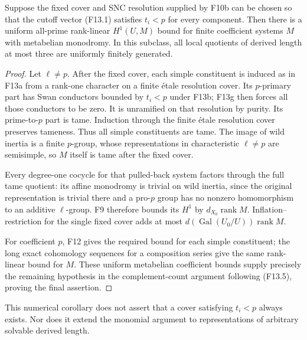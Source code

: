 \begin{corollary}
Suppose the fixed cover and SNC resolution supplied by F10b can
be chosen so that the cutoff vector (F13.1) satisfies $t_i<p$
for every component. Then there is a uniform all-prime
rank-linear $H^1(U,M)$ bound for finite coefficient systems
$M$ with metabelian monodromy. In this subclass, all local
quotients of derived length at most three are uniformly finitely
generated.
\end{corollary}
\begin{proof}
Let $\ell\ne p$. After the fixed cover, each simple constituent
is induced as in F13a from a rank-one character on a finite
\'etale resolution cover. Its $p$-primary part has
Swan conductors bounded by $t_i<p$ under F13b; F13g then forces
all those conductors to be zero. It is unramified on that resolution by
purity. Its prime-to-$p$ part is tame. Induction through the
finite \'etale resolution cover preserves tameness. Thus all
simple constituents are tame. The image of wild inertia is a
finite $p$-group, whose representations in characteristic
$\ell\ne p$ are semisimple, so $M$ itself is tame after the
fixed cover.

Every degree-one cocycle for that pulled-back system factors
through the full tame quotient: its affine monodromy is trivial
on wild inertia, since the original representation is trivial
there and a pro-$p$ group has no nonzero homomorphism to an
additive $\ell$-group. F9 therefore bounds its $H^1$ by
$d_{X_0}\operatorname{rank}M$. Inflation--restriction for the
single fixed cover adds at most
$d(\operatorname{Gal}(U_0/U))\operatorname{rank}M$.

For coefficient $p$, F12 gives the required bound for each
simple constituent; the long exact cohomology sequences for a
composition series give the same rank-linear bound for $M$.
These uniform metabelian coefficient bounds supply precisely
the remaining hypothesis in the complement-count argument
following (F13.5), proving the final assertion.
\end{proof}

This numerical corollary does not assert that a cover satisfying
$t_i<p$ always exists. Nor does it extend the monomial argument
to representations of arbitrary solvable derived length.
